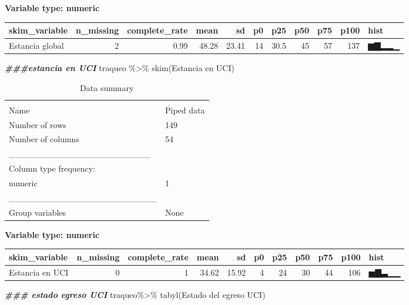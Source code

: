 \documentclass[
]{article}
\newenvironment{Shaded}{\begin{snugshade}}{\end{snugshade}}
\newcommand{\AttributeTok}[1]{\textcolor[rgb]{0.77,0.63,0.00}{#1}}
\newcommand{\DocumentationTok}[1]{\textcolor[rgb]{0.56,0.35,0.01}{\textbf{\textit{#1}}}}
\newcommand{\FunctionTok}[1]{\textcolor[rgb]{0.00,0.00,0.00}{#1}}
\newcommand{\NormalTok}[1]{#1}
\newcommand{\SpecialCharTok}[1]{\textcolor[rgb]{0.00,0.00,0.00}{#1}}
\newcommand{\StringTok}[1]{\textcolor[rgb]{0.31,0.60,0.02}{#1}}
\begin{document}
\textbf{Variable type: numeric}

\begin{longtable}[]{@{}lrrrrrrrrrl@{}}
\toprule
skim\_variable & n\_missing & complete\_rate & mean & sd & p0 & p25 &
p50 & p75 & p100 & hist \\
\midrule
\endhead
Estancia global & 2 & 0.99 & 48.28 & 23.41 & 14 & 30.5 & 45 & 57 & 137 &
▆▇▂▂▁ \\
\bottomrule
\end{longtable}

\begin{Shaded}
\begin{Highlighting}[]
\DocumentationTok{\#\#\#estancia en UCI}
\NormalTok{traqueo }\SpecialCharTok{\%\textgreater{}\%}
  \FunctionTok{skim}\NormalTok{(}\StringTok{\textasciigrave{}}\AttributeTok{Estancia en UCI}\StringTok{\textasciigrave{}}\NormalTok{)}
\end{Highlighting}
\end{Shaded}

\begin{longtable}[]{@{}ll@{}}
\caption{Data summary}\tabularnewline
\toprule
& \\
\midrule
\endfirsthead
\toprule
& \\
\midrule
\endhead
Name & Piped data \\
Number of rows & 149 \\
Number of columns & 54 \\
\_\_\_\_\_\_\_\_\_\_\_\_\_\_\_\_\_\_\_\_\_\_\_ & \\
Column type frequency: & \\
numeric & 1 \\
\_\_\_\_\_\_\_\_\_\_\_\_\_\_\_\_\_\_\_\_\_\_\_\_ & \\
Group variables & None \\
\bottomrule
\end{longtable}

\textbf{Variable type: numeric}

\begin{longtable}[]{@{}lrrrrrrrrrl@{}}
\toprule
skim\_variable & n\_missing & complete\_rate & mean & sd & p0 & p25 &
p50 & p75 & p100 & hist \\
\midrule
\endhead
Estancia en UCI & 0 & 1 & 34.62 & 15.92 & 4 & 24 & 30 & 44 & 106 &
▅▇▃▁▁ \\
\bottomrule
\end{longtable}

\begin{Shaded}
\begin{Highlighting}[]
\DocumentationTok{\#\#\# estado egreso UCI}
\NormalTok{traqueo}\SpecialCharTok{\%\textgreater{}\%}
  \FunctionTok{tabyl}\NormalTok{(}\StringTok{\textasciigrave{}}\AttributeTok{Estado del egreso  UCI}\StringTok{\textasciigrave{}}\NormalTok{)}
\end{Highlighting}
\end{Shaded}
\end{document}
